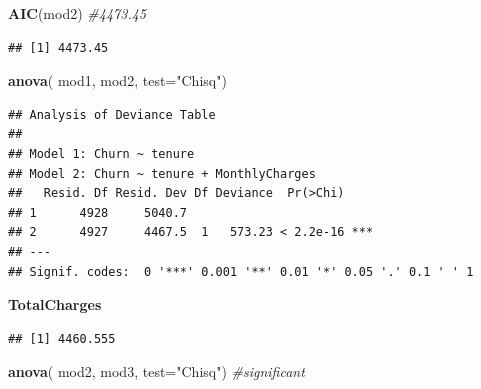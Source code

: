 \documentclass[
  twoside]{article}
\newenvironment{Shaded}{\begin{snugshade}}{\end{snugshade}}
\newcommand{\AttributeTok}[1]{\textcolor[rgb]{0.13,0.29,0.53}{#1}}
\newcommand{\CommentTok}[1]{\textcolor[rgb]{0.56,0.35,0.01}{\textit{#1}}}
\newcommand{\FunctionTok}[1]{\textcolor[rgb]{0.13,0.29,0.53}{\textbf{#1}}}
\newcommand{\NormalTok}[1]{#1}
\newcommand{\OtherTok}[1]{\textcolor[rgb]{0.56,0.35,0.01}{#1}}
\newcommand{\SpecialCharTok}[1]{\textcolor[rgb]{0.81,0.36,0.00}{\textbf{#1}}}
\newcommand{\StringTok}[1]{\textcolor[rgb]{0.31,0.60,0.02}{#1}}
\begin{document}
\begin{Shaded}
\begin{Highlighting}[]
\FunctionTok{AIC}\NormalTok{(mod2) }\CommentTok{\#4473.45}
\end{Highlighting}
\end{Shaded}

\begin{verbatim}
## [1] 4473.45
\end{verbatim}

\begin{Shaded}
\begin{Highlighting}[]
\FunctionTok{anova}\NormalTok{( mod1, mod2,  }\AttributeTok{test=}\StringTok{"Chisq"}\NormalTok{)}
\end{Highlighting}
\end{Shaded}

\begin{verbatim}
## Analysis of Deviance Table
## 
## Model 1: Churn ~ tenure
## Model 2: Churn ~ tenure + MonthlyCharges
##   Resid. Df Resid. Dev Df Deviance  Pr(>Chi)    
## 1      4928     5040.7                          
## 2      4927     4467.5  1   573.23 < 2.2e-16 ***
## ---
## Signif. codes:  0 '***' 0.001 '**' 0.01 '*' 0.05 '.' 0.1 ' ' 1
\end{verbatim}

\textbf{TotalCharges}

\begin{Shaded}
\end{Shaded}

\begin{verbatim}
## [1] 4460.555
\end{verbatim}

\begin{Shaded}
\begin{Highlighting}[]
\FunctionTok{anova}\NormalTok{( mod2, mod3,  }\AttributeTok{test=}\StringTok{"Chisq"}\NormalTok{) }\CommentTok{\#significant}
\end{Highlighting}
\end{Shaded}
\end{document}

